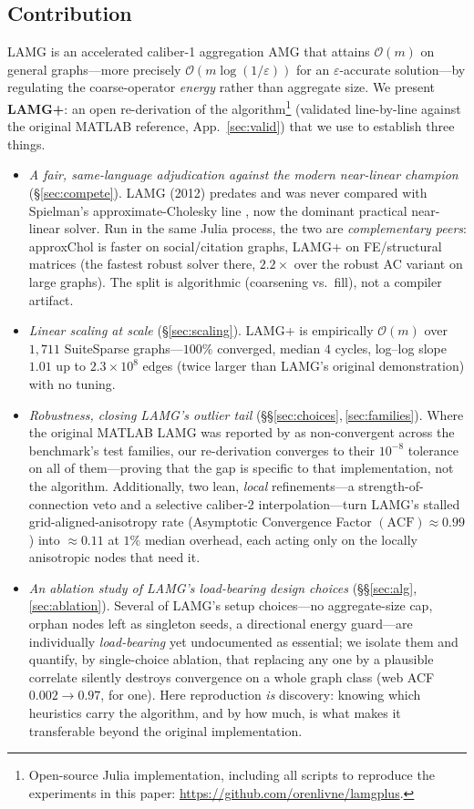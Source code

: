 \documentclass[review]{siamart220329}
\newcommand{\Om}{\mathcal{O}(m)}
\newcommand{\acf}{\mathrm{ACF}}
\begin{document}
\subsection{Contribution}\label{sec:contrib}
LAMG \cite{lamg} is an accelerated caliber-1 aggregation AMG that attains $\Om$ on general
graphs---more precisely $\mathcal{O}(m\log(1/\varepsilon))$ for an $\varepsilon$-accurate
solution---by regulating the coarse-operator \emph{energy} rather than aggregate size. We present
\textbf{LAMG+}: an open re-derivation of the algorithm\footnote{Open-source Julia implementation,
including all scripts to reproduce the experiments in this paper: \url{https://github.com/orenlivne/lamgplus}.}
(validated line-by-line against the
original MATLAB reference, App.~\ref{sec:valid}) that we use to establish three things.
\begin{itemize}[leftmargin=1.4em,itemsep=1pt]
\item \emph{A fair, same-language adjudication against the modern near-linear champion}
(\S\ref{sec:compete}). LAMG (2012) predates and was never compared with Spielman's approxi\-mate-Cholesky
line \cite{laplacians,gks2023}, now the dominant practical near-linear solver.
Run in the same Julia process, the two are \emph{complementary peers}: approxChol is
faster on social/citation graphs, LAMG+ on FE/structural matrices (the fastest robust solver there,
$2.2\times$ over the robust AC variant on large graphs). The split is algorithmic
(coarsening vs.\ fill), not a compiler artifact.
\item \emph{Linear scaling at scale} (\S\ref{sec:scaling}). LAMG+ is empirically $\Om$ over
$1{,}711$ SuiteSparse graphs---$100\%$ converged, median $4$ cycles, log--log slope $1.01$ up to $2.3\!\times\!10^8$ edges (twice larger than LAMG's original demonstration) with no tuning.
\item \emph{Robustness, closing LAMG's outlier tail} (\S\S\ref{sec:choices},\,\ref{sec:families}).
Where the original MATLAB LAMG was reported by \cite{gks2023} as non-convergent across the benchmark's test families, our
re-derivation converges to their $10^{-8}$ tolerance on all of them---proving that the gap is specific to
that implementation, not the algorithm.
Additionally, two lean, \emph{local} refinements---a strength-of-connection veto and a selective caliber-2
interpolation---turn LAMG's stalled
grid-aligned-anisotropy rate (Asymptotic Convergence Factor $(\acf)\approx0.99$) into $\approx0.11$ at $\!1\%$ median
overhead, each acting only on the locally anisotropic nodes that need it. 
\item \emph{An ablation study of LAMG's load-bearing design choices} (\S\S\ref{sec:alg},\,\ref{sec:ablation}).
Several of LAMG's setup choices---no aggregate-size cap, orphan nodes left as singleton seeds, a
directional energy guard---are individually \emph{load-bearing} yet undocumented as essential; we
isolate them and quantify, by single-choice ablation, that replacing any one by a plausible correlate
silently destroys convergence on a whole graph class (web ACF $0.002\!\to\!0.97$, for one). Here
reproduction \emph{is} discovery: knowing which heuristics carry the algorithm, and by how much, is
what makes it transferable beyond the original implementation.
\end{itemize}
\end{document}
